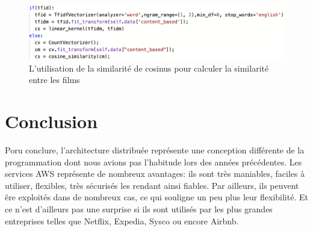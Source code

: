 \documentclass[a4paper, 12pt, oneside]{book}
\newcounter{program}[subsection]
\begin{document}
\begin{figure}[H]
  \centering
  \includegraphics[width=1.0\textwidth]{images/python-cosine}
  \caption{L'utilisation de la similarité de cosinus pour calculer la similarité entre les films}
  \label{fig:python-cosine}
\end{figure}

\chapter{Conclusion}

Poru conclure, l'architecture distribuée représente une conception différente de la programmation dont nous avions pas l'habitude lors des années précédentes. Les services AWS représente de nombreux avantages: ils sont très maniables, faciles à utiliser, flexibles, très sécurisés les rendant ainsi fiables. Par ailleurs, ils peuvent êre exploités dans de nombreux cas, ce qui souligne un peu plus leur flexibilité. Et ce n'est d'ailleurs pas une surprise si ils sont utilisés par les plus grandes entreprises telles que Netflix, Expedia, Sysco ou encore Airbnb.


% 
\end{document}
